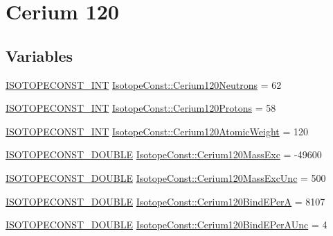 \hypertarget{group___isotope_const-_cerium-_ce120}{}\section{Cerium 120}
\label{group___isotope_const-_cerium-_ce120}
\subsection*{Variables}
\begin{DoxyCompactItemize}
\item 
\mbox{\hyperlink{group___isotope_const-_macros_ga5f18360b3e99483a35c32d789e62621c}{I\+S\+O\+T\+O\+P\+E\+C\+O\+N\+S\+T\+\_\+\+I\+NT}} \mbox{\hyperlink{group___isotope_const-_cerium-_ce120_ga28a0d9d85fbe2d843d52637124067c83}{Isotope\+Const\+::\+Cerium120\+Neutrons}} = 62
\item 
\mbox{\hyperlink{group___isotope_const-_macros_ga5f18360b3e99483a35c32d789e62621c}{I\+S\+O\+T\+O\+P\+E\+C\+O\+N\+S\+T\+\_\+\+I\+NT}} \mbox{\hyperlink{group___isotope_const-_cerium-_ce120_gab514b4c405bbdf8404b29ba47d3943ce}{Isotope\+Const\+::\+Cerium120\+Protons}} = 58
\item 
\mbox{\hyperlink{group___isotope_const-_macros_ga5f18360b3e99483a35c32d789e62621c}{I\+S\+O\+T\+O\+P\+E\+C\+O\+N\+S\+T\+\_\+\+I\+NT}} \mbox{\hyperlink{group___isotope_const-_cerium-_ce120_ga06d2fd1b1f6af422833e1ede652f5af8}{Isotope\+Const\+::\+Cerium120\+Atomic\+Weight}} = 120
\item 
\mbox{\hyperlink{group___isotope_const-_macros_ga8f45a7272ce02c0b4c65c44636ed719a}{I\+S\+O\+T\+O\+P\+E\+C\+O\+N\+S\+T\+\_\+\+D\+O\+U\+B\+LE}} \mbox{\hyperlink{group___isotope_const-_cerium-_ce120_gabe8747594e67ce42e1ebe618900d0939}{Isotope\+Const\+::\+Cerium120\+Mass\+Exc}} = -\/49600
\item 
\mbox{\hyperlink{group___isotope_const-_macros_ga8f45a7272ce02c0b4c65c44636ed719a}{I\+S\+O\+T\+O\+P\+E\+C\+O\+N\+S\+T\+\_\+\+D\+O\+U\+B\+LE}} \mbox{\hyperlink{group___isotope_const-_cerium-_ce120_ga901c2ab3bae84937c8f5c3952f3e84f4}{Isotope\+Const\+::\+Cerium120\+Mass\+Exc\+Unc}} = 500
\item 
\mbox{\hyperlink{group___isotope_const-_macros_ga8f45a7272ce02c0b4c65c44636ed719a}{I\+S\+O\+T\+O\+P\+E\+C\+O\+N\+S\+T\+\_\+\+D\+O\+U\+B\+LE}} \mbox{\hyperlink{group___isotope_const-_cerium-_ce120_ga76699b3910fe06c4e0be49c090d95da9}{Isotope\+Const\+::\+Cerium120\+Bind\+E\+PerA}} = 8107
\item 
\mbox{\hyperlink{group___isotope_const-_macros_ga8f45a7272ce02c0b4c65c44636ed719a}{I\+S\+O\+T\+O\+P\+E\+C\+O\+N\+S\+T\+\_\+\+D\+O\+U\+B\+LE}} \mbox{\hyperlink{group___isotope_const-_cerium-_ce120_gac4e42aed7325c39e3dda94fbe0c3b6a8}{Isotope\+Const\+::\+Cerium120\+Bind\+E\+Per\+A\+Unc}} = 4

\end{DoxyCompactItemize}
